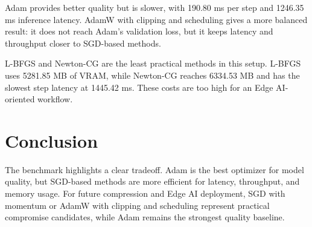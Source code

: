 \vspace*{0.15cm}

Adam provides better quality but is slower, with 190.80 ms per step and 1246.35
ms inference latency. AdamW with clipping and scheduling gives a more balanced
result: it does not reach Adam's validation loss, but it keeps latency and
throughput closer to SGD-based methods.

\vspace*{0.15cm}

L-BFGS and Newton-CG are the least practical methods in this setup. L-BFGS uses
5281.85 MB of VRAM, while Newton-CG reaches 6334.53 MB and has the slowest step
latency at 1445.42 ms. These costs are too high for an Edge AI-oriented workflow.

\section{Conclusion}

The benchmark highlights a clear tradeoff. Adam is the best optimizer for model
quality, but SGD-based methods are more efficient for latency, throughput, and
memory usage. For future compression and Edge AI deployment, SGD with momentum or
AdamW with clipping and scheduling represent practical compromise candidates,
while Adam remains the strongest quality baseline.
